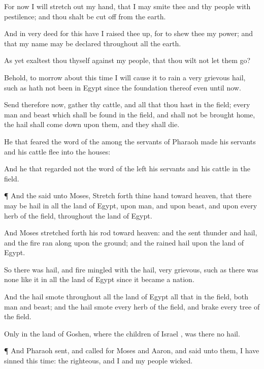 {For now I will stretch
out my
hand, that I may
smite thee and thy
people with
pestilence; and thou shalt be cut
off from the
earth.

And in
very
deed for this
{} have I raised thee
up, for to
shew
{} thee my
power; and that my
name may be
declared throughout all the
earth.

As yet
exaltest thou thyself against my
people, that thou wilt not let them
go?

Behold, to
morrow about this
time I will cause it to
rain a
very
grievous
hail, such as hath not
been in
Egypt
since the
foundation thereof even until now.

Send therefore now,
{}
gather thy
cattle, and all that thou hast in the
field;
{} every
man and
beast which shall be
found in the
field, and shall not be
brought
home, the
hail shall come
down upon them, and they shall
die.

He that
feared the
word of the
{} among the
servants of
Pharaoh made his
servants and his
cattle
flee into the
houses:

And he that
regarded not the
word of the
{}
left his
servants and his
cattle in the
field.


\par }{\PP {}¶ And the
{}
said unto
Moses, Stretch
forth thine
hand toward
heaven, that there may be
hail in all the
land of
Egypt, upon
man, and upon
beast, and upon every
herb of the
field, throughout the
land of
Egypt.

And
Moses stretched
forth his
rod toward
heaven: and the
{}
sent
thunder and
hail, and the
fire ran
along upon the
ground; and the
{}
rained
hail upon the
land of
Egypt.

So there was
hail, and
fire
mingled with the
hail,
very
grievous, such as there was
none like it in all the
land of
Egypt since it became a
nation.

And the
hail
smote throughout all the
land of
Egypt all that
{} in the
field, both
man and
beast; and the
hail
smote every
herb of the
field, and
brake every
tree of the
field.

Only in the
land of
Goshen, where the
children of
Israel
{}, was there no
hail.


\par }{\PP {}¶ And
Pharaoh
sent, and
called for
Moses and
Aaron, and
said unto them, I have
sinned this
time: the
{}
{}
righteous, and I and my
people
{}
wicked.

}

